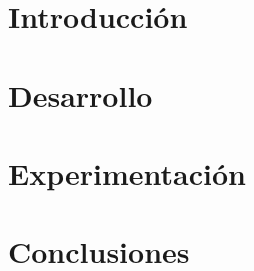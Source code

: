 \documentclass[a4paper, 10pt, twoside]{article}
\begin{document}
\newpage

\tableofcontents

\newpage


\section{Introducción}



\newpage

\section{Desarrollo}



\section{Experimentaci\'on}



\section{Conclusiones}


\end{document}
